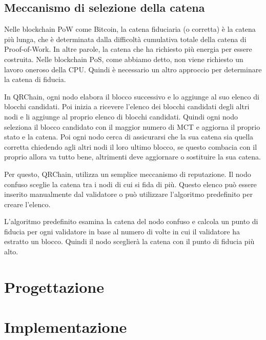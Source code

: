 \subsection{Meccanismo di selezione della catena}
Nelle blockchain PoW come Bitcoin, la catena fiduciaria (o corretta) è la catena più lunga, che è determinata dalla difficoltà cumulativa totale della catena di Proof-of-Work. In altre parole, la catena che ha richiesto più energia per essere costruita.
Nelle blockchain PoS, come abbiamo detto, non viene richiesto un lavoro oneroso della CPU. Quindi è necessario un altro approccio per determinare la catena di fiducia.

In QRChain, ogni nodo elabora il blocco successivo e lo aggiunge al suo elenco di blocchi candidati. Poi inizia a ricevere l'elenco dei blocchi candidati degli altri nodi e li aggiunge al proprio elenco di blocchi candidati.
Quindi ogni nodo seleziona il blocco candidato con il maggior numero di MCT e aggiorna il proprio stato e la catena.
Poi ogni nodo cerca di assicurarsi che la sua catena sia quella corretta chiedendo agli altri nodi il loro ultimo blocco, se questo combacia con il proprio allora va tutto bene, altrimenti deve aggiornare o sostituire la sua catena.

Per questo, QRChain, utilizza un semplice meccanismo di reputazione. Il nodo confuso sceglie la catena tra i nodi di cui si fida di più. Questo elenco può essere inserito manualmente dal validatore o può utilizzare l'algoritmo predefinito per creare l'elenco.

L'algoritmo predefinito esamina la catena del nodo confuso e calcola un punto di fiducia per ogni validatore in base al numero di volte in cui il validatore ha estratto un blocco.
Quindi il nodo sceglierà la catena con il punto di fiducia più alto.

\section{Progettazione}

\section{Implementazione}